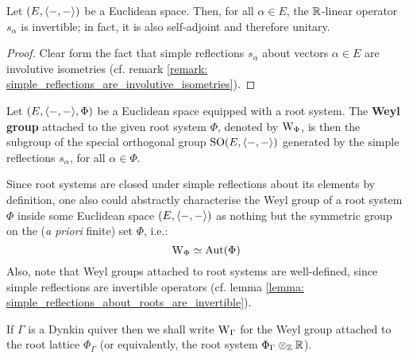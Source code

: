             \begin{lemma} \label{lemma: simple_reflections_about_roots_are_invertible}
                Let $(E, \langle-, -\rangle)$ be a Euclidean space. Then, for all $\alpha \in E$, the $\mathbb{R}$-linear operator $s_{\alpha}$ is invertible; in fact, it is also self-adjoint and therefore unitary.
            \end{lemma}
                \begin{proof}
                    Clear form the fact that simple reflections $s_{\alpha}$ about vectors $\alpha \in E$ are involutive isometries (cf. remark \ref{remark: simple_reflections_are_involutive_isometries}).
                \end{proof}
            \begin{definition} \label{def: weyl_groups}
                Let $(E, \langle-, -\rangle, \Phi)$ be a Euclidean space equipped with a root system. The \textbf{Weyl group} attached to the given root system $\Phi$, denoted by $\mathrm{W}_{\Phi}$, is then the subgroup of the special orthogonal group $\mathrm{SO}(E, \langle-, -\rangle)$ generated by the simple reflections $s_{\alpha}$, for all $\alpha \in \Phi$.
            \end{definition}
            \begin{remark}
                Since root systems are closed under simple reflections about its elements by definition, one also could abstractly characterise the Weyl group of a root system $\Phi$ inside some Euclidean space $(E, \langle-, -\rangle)$ as nothing but the symmetric group on the (\textit{a priori} finite) set $\Phi$, i.e.:
                    $$\mathrm{W}_{\Phi} \simeq \mathrm{Aut}(\Phi)$$
                Also, note that Weyl groups attached to root systems are well-defined, since simple reflections are invertible operators (cf. lemma \ref{lemma: simple_reflections_about_roots_are_invertible}).
            \end{remark}
            \begin{convention}
                If $\Gamma$ is a Dynkin quiver then we shall write $\mathrm{W}_{\Gamma}$ for the Weyl group attached to the root lattice $\Phi_{\Gamma}$ (or equivalently, the root system $\Phi_{\Gamma} \tensor_{\Z} \R$). 
            \end{convention}
            

